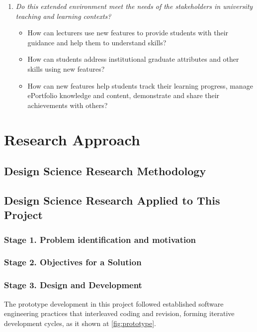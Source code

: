 \begin{enumerate}
	\item \textit{Do this extended environment meet the needs of the stakeholders
in university teaching and learning contexts?}
	\begin{itemize}
		\item How can lecturers use new features to provide students with their
guidance and help them to understand \LLLs skills?
		\item How can students address institutional graduate attributes and other
		skills using new features?
		\item How can new features help students track their learning progress, manage
ePortfolio knowledge and content, demonstrate and share their achievements
with others?
	\end{itemize}
\end{enumerate}

\section{Research Approach}

\subsection{Design Science Research Methodology}

\subsection{Design Science Research Applied to This Project}

\subsubsection{Stage 1. Problem identification and motivation}

\subsubsection{Stage 2. Objectives for a Solution}

\subsubsection{Stage 3. Design and Development}

The prototype development in this project followed established
software engineering practices that interleaved coding and revision, forming
iterative development cycles, as it shown at \ref{fig:prototype}.


